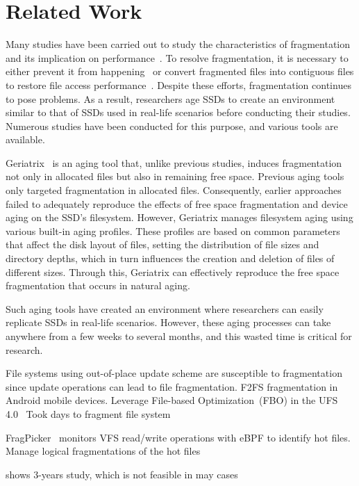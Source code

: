 \section{Related Work}
\label{s:related}

Many studies have been carried out to study the characteristics of fragmentation and its implication on performance~\cite{}.
To resolve fragmentation, it is necessary to either prevent it from happening~\cite{} or convert fragmented files into contiguous files to restore file access performance~\cite{}.
Despite these efforts, fragmentation continues to pose problems.
As a result, researchers age SSDs to create an environment similar to that of SSDs used in real-life scenarios before conducting their studies.
Numerous studies have been conducted for this purpose, and various tools are available.

Geriatrix~\cite{geriatrix:atc18} is an aging tool that, unlike previous studies, induces fragmentation not only in allocated files but also in remaining free space.
Previous aging tools only targeted fragmentation in allocated files.
Consequently, earlier approaches failed to adequately reproduce the effects of free space fragmentation and device aging on the SSD's filesystem.
However, Geriatrix manages filesystem aging using various built-in aging profiles. These profiles are based on common parameters that affect the disk layout of files, setting the distribution of file sizes and directory depths, which in turn influences the creation and deletion of files of different sizes. Through this, Geriatrix can effectively reproduce the free space fragmentation that occurs in natural aging.


Such aging tools have created an environment where researchers can easily replicate SSDs in real-life scenarios.
However, these aging processes can take anywhere from a few weeks to several months, and this wasted time is critical for research.


File systems using out-of-place update scheme are susceptible to fragmentation since update operations can lead to file fragmentation.
\cite{f2fs-mobile:nvmsa24} F2FS fragmentation in Android mobile devices.
Leverage File-based Optimization~(FBO) in the UFS 4.0~\cite{ufs4.0}
Took days to fragment file system


FragPicker~\cite{fragpicker:sosp21} monitors VFS read/write operations with eBPF to identify hot files.
Manage logical fragmentations of the hot files


\cite{fs-aging:sigmetrics97} shows 3-years study, which is not feasible in may cases

